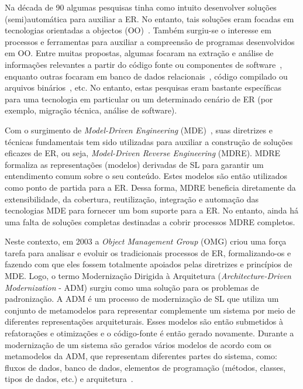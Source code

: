 Na década de 90 algumas pesquisas tinha como intuito desenvolver soluções (semi)automática para auxiliar a ER. No entanto, tais soluções eram focadas em tecnologias orientadas a objectos (OO)~\citep{Software_Reuse_and_Reverse_Engineering_in_Practice}. Também surgiu-se o interesse em processos e ferramentas para auxiliar a compreensão de programas desenvolvidos em OO. Entre muitas propostas, algumas focaram na extração e análise de informações relevantes a partir do código fonte ou componentes de software~\citep{Re2_Reverse_engineering_and_reuse_re_engineering}, enquanto outras focaram em banco de dados relacionais~\citep{An_approach_for_reverse_engineering_of_relational_databases}, código compilado ou arquivos binários~\citep{Reversing_Secrets_of_Reverse_Engineering}, etc. No entanto, estas pesquisas eram bastante específicas para uma tecnologia em particular ou um determinado cenário de ER (por exemplo, migração técnica, análise de software).

Com o surgimento de \textit{Model-Driven Engineering} (MDE)~\citep{Model_Driven_Engineering}, suas diretrizes e técnicas fundamentais tem sido utilizadas para auxiliar a construção de soluções eficazes de ER, ou seja, \textit{Model-Driven Reverse Engineering} (MDRE). MDRE formaliza as representações (modelos) derivadas de SL para garantir um entendimento comum sobre o seu conteúdo. Estes modelos são então utilizados como ponto de partida para a ER. Dessa forma, MDRE beneficia diretamente da extensibilidade, da cobertura, reutilização, integração e automação das tecnologias MDE para fornecer um bom suporte para a ER. No entanto, ainda há uma falta de soluções completas destinadas a cobrir processos MDRE completos.

Neste contexto, em 2003 a \textit{Object Management Group} (OMG) criou uma força tarefa para analisar e evoluir os tradicionais processos de ER, formalizando-os e fazendo com que eles fossem totalmente apoiados pelas diretrizes e princípios de MDE. Logo, o termo Modernização Dirigida à Arquitetura (\textit{Architecture-Driven Modernization} - ADM) surgiu como uma solução para os problemas de padronização. A ADM é um processo de modernização de SL que utiliza um conjunto de metamodelos para representar complemente um sistema por meio de diferentes representações arquiteturais. Esses modelos são então submetidos à refatorações e otimizações e o código-fonte é então gerado novamente. Durante a modernização de um sistema são gerados vários modelos de acordo com os metamodelos da ADM, que representam diferentes partes do sistema, como: fluxos de dados, banco de dados, elementos de programação (métodos, classes, tipos de dados, etc.) e arquitetura~\citep{Information_Systems_Transformation_Architecture_Driven_Modernization_Case_Studies, Software_modernization_by_recovering_Web_services_from_legacy_databases}.

